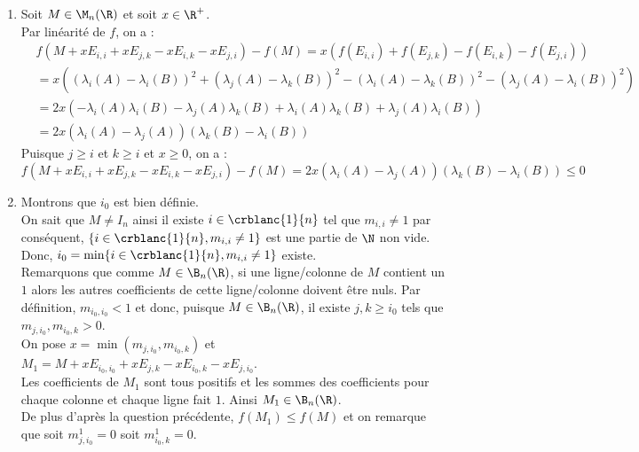 \documentclass[8pt]{book}
\begin{document}
\begin{enumerate}[leftmargin=*]
		De plus, $\B_n(\R)$ est borné par $\normep{\infty}{\cdot} : M\mapsto \max\limits_{1\leq i,j\leq n}|m_{i,j}|$ par $1$ par exemple.\\
		Puisque $\M_n(\R)$ est de dimension finie, $\B_n(\R)$ est un compact.\\
		On a que $f$ est continue (linéarité sur un espace de dimension finie) et que $\B_n(\R)$ est compact, ainsi d'après le théorème des bornes atteintes, $f$ admet un minimum sur $\B_n(\R)$.
		\item Soit $M\in\M_n(\R)$ et soit $x\in\R^+$.\\
		Par linéarité de $f$, on a :
		\begin{align*}
			&f(M+xE_{i,i}+xE_{j,k}-xE_{i,k}-xE_{j,i})-f(M)=x\left(f(E_{i,i})+f(E_{j,k})-f(E_{i,k})-f(E_{j,i})\right)\\
			&=x\left((\lambda_i(A)-\lambda_i(B))^2+(\lambda_j(A)-\lambda_k(B))^2-(\lambda_i(A)-\lambda_k(B))^2-(\lambda_j(A)-\lambda_i(B))^2\right)\\
			&=2x\left(-\lambda_i(A)\lambda_i(B)-\lambda_j(A)\lambda_k(B)+\lambda_i(A)\lambda_k(B)+\lambda_j(A)\lambda_i(B)\right)\\
			&=2x(\lambda_i(A)-\lambda_j(A))(\lambda_k(B)-\lambda_i(B))
		\end{align*}
		Puisque $j\geq i$ et $k\geq i$ et $x\geq 0$, on a :
		\[f(M+xE_{i,i}+xE_{j,k}-xE_{i,k}-xE_{j,i})-f(M)=2x(\lambda_i(A)-\lambda_j(A))(\lambda_k(B)-\lambda_i(B))\leq 0\]
		\item Montrons que $i_0$ est bien définie.\\
		On sait que $M\ne I_n$ ainsi il existe $i\in\crblanc{1}{n}$ tel que $m_{i,i}\ne 1$ par conséquent, $\{i\in\crblanc{1}{n}, m_{i,i}\ne 1\}$ est une partie de $\N$ non vide. Donc, $i_0=\min \{i\in\crblanc{1}{n}, m_{i,i}\ne 1\}$ existe.\\
		Remarquons que comme $M\in \B_n(\R)$, si une ligne/colonne de $M$ contient un $1$ alors les autres coefficients de cette ligne/colonne doivent être nuls.
		Par définition, $m_{i_0,i_0}<1$ et donc, puisque $M\in\B_n(\R)$, il existe $j,k\geq i_0$ tels que $m_{j,i_0},m_{i_0,k}>0$.\\
		On pose $x=\min(m_{j,i_0},m_{i_0,k})$ et $M_1=M+xE_{i_0,i_0}+xE_{j,k}-xE_{i_0,k}-xE_{j,i_0}$.\\
		Les coefficients de $M_1$ sont tous positifs et les sommes des coefficients pour chaque colonne et chaque ligne fait $1$. Ainsi $M_1\in\B_n(\R)$.\\
		De plus d'après la question précédente, $f(M_1)\leq f(M)$ et on remarque que soit $m^1_{j,i_0}=0$ soit $m^1_{i_0,k}=0$.\\

\end{enumerate}
\end{document}
